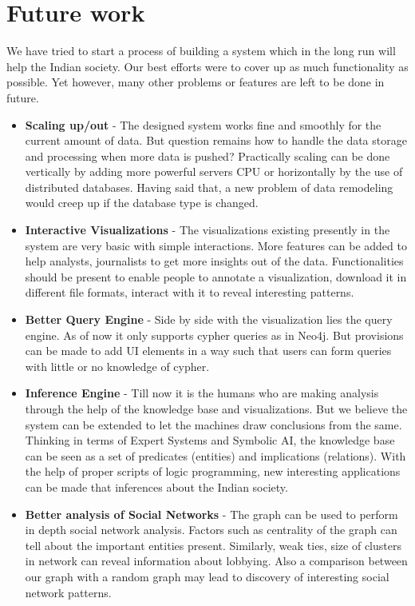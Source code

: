 \section{Future work}
We have tried to start a process of building a system which in the long run will help the Indian society. Our best efforts were to cover up as much functionality as possible. Yet however, many other problems or features are left to be done in future.
\begin{itemize}
\item \textbf{Scaling up/out} - The designed system works fine and smoothly for the current amount of data. But question remains how to handle the data storage and processing when more data is pushed? Practically scaling can be done vertically by adding more powerful servers CPU or horizontally by the use of distributed databases. Having said that, a new problem of data remodeling would creep up if the database type is changed.

\item \textbf{Interactive Visualizations} - The visualizations existing presently in the system are very basic with simple interactions. More features can be added to help analysts, journalists to get more insights out of the data. Functionalities should be present to enable people to annotate a visualization, download it in different file formats, interact with it to reveal interesting patterns.

\item \textbf{Better Query Engine} - Side by side with the visualization lies the query engine. As of now it only supports cypher queries as in Neo4j. But provisions can be made to add UI elements in a way such that users can form queries with little or no knowledge of cypher.

\item \textbf{Inference Engine} - Till now it is the humans who are making analysis through the help of the knowledge base and visualizations. But we believe the system can be extended to let the machines draw conclusions from the same. Thinking in terms of Expert Systems and Symbolic AI, the knowledge base can be seen as a set of predicates (entities) and implications (relations). With the help of proper scripts of logic programming, new interesting applications can be made that inferences about the Indian society.

\item \textbf{Better analysis of Social Networks} - The graph can be used to perform in depth social network analysis. Factors such as centrality of the graph can tell about the important entities present. Similarly, weak ties, size of clusters in network can reveal information about lobbying. Also a comparison between our graph with a random graph may lead to discovery of interesting social network patterns.


\end{itemize}
